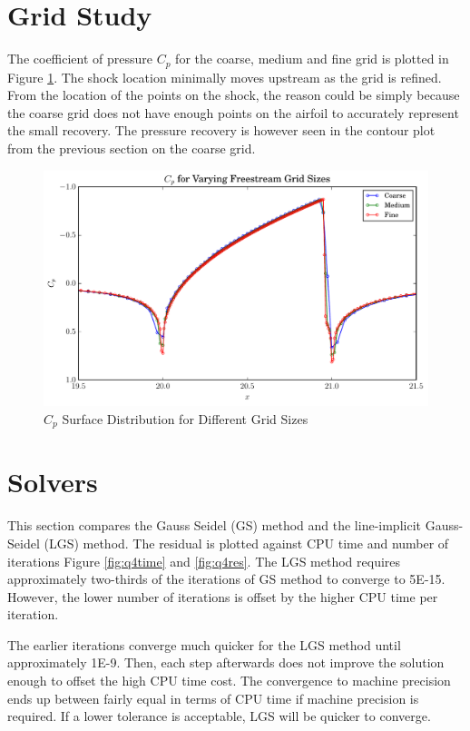 \documentclass[letterpaper,12pt,]{article}
\begin{document}
\clearpage

\section*{Grid Study}

The coefficient of pressure $C_p$ for the coarse, medium and fine grid is plotted in Figure \ref{fig:q3cpsurf}.
The shock location minimally moves upstream as the grid is refined.
From the location of the points on the shock, the reason could be simply because the coarse grid does not have enough points on the airfoil to accurately represent the small recovery.
The pressure recovery is however seen in the contour plot from the previous section on the coarse grid.

\begin{figure}[!htbp]
    \centering
    \includegraphics[width=\linewidth]{./Figures/q3cpsurf.pdf}
    \caption{$C_p$ Surface Distribution for Different Grid Sizes}
    \label{fig:q3cpsurf}
\end{figure}

\clearpage
\section*{Solvers}

This section compares the Gauss Seidel (GS) method and the line-implicit Gauss-Seidel (LGS) method.
The residual is plotted against CPU time and number of iterations Figure \ref{fig:q4time} and \ref{fig:q4res}.
The LGS method requires approximately two-thirds of the iterations of GS method to converge to 5\textsc{E-}15.
However, the lower number of iterations is offset by the higher CPU time per iteration.

The earlier iterations converge much quicker for the LGS method until approximately 1\textsc{E-}9.
Then, each step afterwards does not improve the solution enough to offset the high CPU time cost.
The convergence to machine precision ends up between fairly equal in terms of CPU time if machine precision is required.
If a lower tolerance is acceptable, LGS will be quicker to converge.
\end{document}
